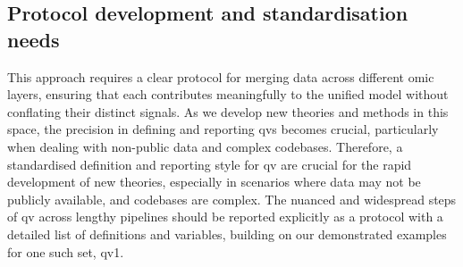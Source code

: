 \subsection{Protocol development and standardisation needs} 

This approach requires a clear protocol for merging data across different omic layers, ensuring that each contributes meaningfully to the unified model without conflating their distinct signals. As we develop new theories and methods in this space, the precision in defining and reporting \ac{qv}s becomes crucial, particularly when dealing with non-public data and complex codebases. Therefore, a standardised definition and reporting style for \ac{qv} are crucial for the rapid development of new theories, especially in scenarios where data may not be publicly available, and codebases are complex. The nuanced and widespread steps of \ac{qv} across lengthy pipelines should be reported explicitly as a protocol with a detailed list of definitions and variables, building on our demonstrated examples for one such set, \ac{qv}1.

